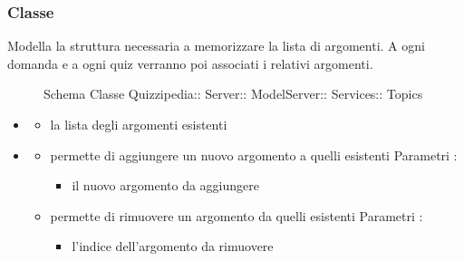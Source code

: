 \subsubsection{Classe }
Modella la struttura necessaria a memorizzare la lista di argomenti. A ogni domanda e a ogni quiz verranno poi associati i relativi argomenti.
\begin{figure}[H]
\centering
\noindent{}
\caption[Schema Classe Topics]{Schema Classe Quizzipedia:: Server:: ModelServer:: Services:: Topics}
\end{figure}
\begin{itemize}
\item {}
\begin{itemize}
\item {}
\newline
la lista degli argomenti esistenti
\end{itemize}
\item {}
\begin{itemize}
\item {}
\newline
permette di aggiungere un nuovo argomento a quelli esistenti
\newline
Parametri :
\begin{itemize}
\item {}
\newline
il nuovo argomento da aggiungere
\end{itemize}
\item {}
\newline
permette di rimuovere un argomento da quelli esistenti
\newline
Parametri :
\begin{itemize}
\item {}
\newline
l'indice dell'argomento da rimuovere
\end{itemize}
\end{itemize}
\end{itemize}
